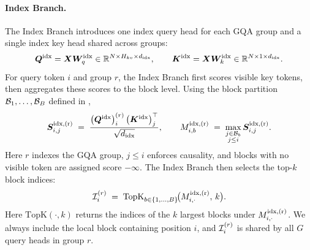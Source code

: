 \paragraph{Index Branch.} The Index Branch introduces one index query head for each GQA group and a single index key head shared across groups:
\begin{equation}
\label{eq:msa-index-proj}
{\bm{Q}}^{\rm idx} = {\bm{X}} {\bm{W}}_q^{\rm idx} \in \mathbb{R}^{N \times H_{kv} \times d_{\rm idx}},
\qquad
{\bm{K}}^{\rm idx} = {\bm{X}} {\bm{W}}_k^{\rm idx} \in \mathbb{R}^{N \times 1 \times d_{\rm idx}}.
\end{equation}
For query token $i$ and group $r$, the Index Branch first scores visible key tokens, then aggregates these scores to the block level. Using the block partition ${\mathcal{B}}_1,\dots,{\mathcal{B}}_B$ defined in ,
\begin{equation}
\label{eq:msa-index-score}
{\bm{S}}^{\rm idx,(r)}_{i,j}
\;=\;
\frac{\bigl({\bm{Q}}^{\rm idx}\bigr)^{(r)}_i \,\bigl({\bm{K}}^{\rm idx}\bigr)_j^{\top}}
     {\sqrt{d_{\rm idx}}},
\qquad
M^{\rm idx,(r)}_{i,b}
\;=\;
\max_{\substack{j \in {\mathcal{B}}_b \\ j \le i}}
{\bm{S}}^{\rm idx,(r)}_{i,j}.
\end{equation}
Here $r$ indexes the GQA group, $j \le i$ enforces causality, and blocks with no visible token are assigned score $-\infty$. The Index Branch then selects the top-$k$ block indices:
\begin{equation}
\label{eq:msa-topk}
{\mathcal{I}}_i^{(r)}
\;=\;
\mathrm{TopK}_{b \in \{1,\dots,B\}}\!\bigl(M^{\rm idx,(r)}_{i,\cdot},\, k\bigr).
\end{equation}
Here $\mathrm{TopK}(\cdot, k)$ returns the indices of the $k$ largest blocks under $M^{\rm idx,(r)}_{i,\cdot}$. We always include the local block containing position $i$, and ${\mathcal{I}}_i^{(r)}$ is shared by all $G$ query heads in group $r$.


